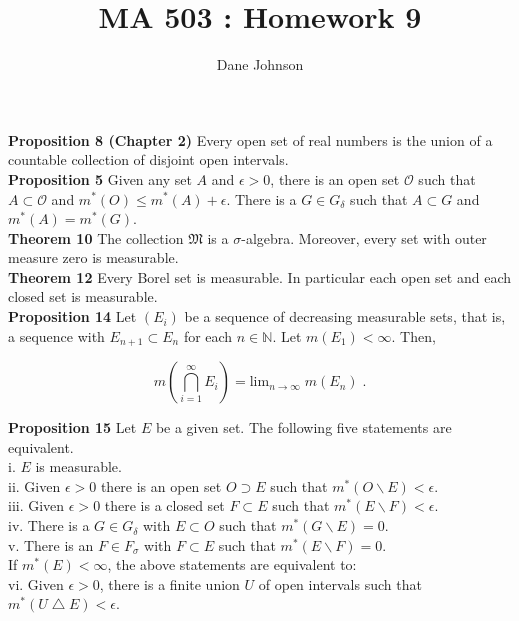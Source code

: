 \documentclass[a4paper]{article}
\title{MA 503 : Homework 9}
\author{Dane Johnson}
\begin{document}
\maketitle

{\bf Proposition 8 (Chapter 2)} Every open set of real numbers is the union of a countable collection of disjoint open intervals. \\

{\bf Proposition 5} Given any set $A$ and $\epsilon > 0$, there is an open set $\mathcal{O}$ such that $A\subset \mathcal{O}$ and $m^*(O) \leq m^*(A) + \epsilon$. There is a $G \in G_\delta$ such that $A \subset G$ and $m^*(A) = m^*(G)$. \\

{\bf Theorem 10} The collection $\mathfrak{M}$ is a $\sigma$-algebra. Moreover, every set with outer measure zero is measurable.\\

{\bf Theorem 12} Every Borel set is measurable. In particular each open set and each closed set is measurable. \\

{\bf Proposition 14} Let $(E_i)$ be a sequence of decreasing measurable sets, that is, a sequence with $E_{n+1} \subset E_n$ for each $n \in \mathbb{N}$. Let $m(E_1)<\infty$. Then,

$$m\left(\bigcap_{i=1}^\infty E_i \right) = \text{lim}_{n\rightarrow \infty} \; m(E_n) \;.$$

{\bf Proposition 15} Let $E$ be a given set. The following five statements are equivalent.\\

i. $E$ is measurable.\\
ii. Given $\epsilon > 0$ there is an open set $O \supset E$ such that $m^*(O \backslash E) < \epsilon$. \\
iii. Given $\epsilon > 0$ there is a closed set $F \subset E$ such that $m^*(E \backslash F) < \epsilon$.\\
iv. There is a $G \in G_{\delta}$ with $E \subset O$ such that $m^*(G \backslash E) = 0$.\\
v. There is an $F \in F_\sigma$ with $F \subset E$ such that $m^*(E \backslash F) = 0$. \\

If $m^*(E) < \infty$, the above statements are equivalent to:\\

vi. Given $\epsilon > 0$, there is a finite union $U$ of open intervals such that $m^*(U \bigtriangleup E) < \epsilon$.\\
\end{document}

